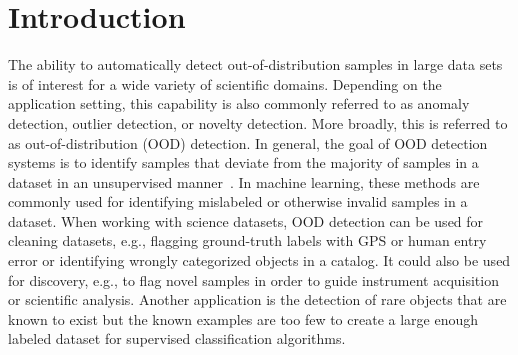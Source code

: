 \documentclass[letterpaper]{article} %
\begin{document}
\section{Introduction}
The ability to automatically detect out-of-distribution samples in large data 
sets is of interest for a wide variety of scientific domains. Depending on the
 application setting, this capability is also commonly referred to as anomaly
  detection, outlier detection, or novelty detection. More broadly, this is 
  referred to as out-of-distribution (OOD) detection. In general, the goal of 
  OOD detection systems is to identify samples that deviate from the majority
   of samples in a dataset in an unsupervised manner~\cite{pimentel2014review}. 
   In machine learning, these methods are commonly used for identifying 
   mislabeled or otherwise invalid samples in a dataset. When working with science datasets, OOD detection can be used for 
   cleaning datasets, e.g., flagging ground-truth labels with GPS or human
    entry error or identifying wrongly categorized objects in a catalog. 
    It could also be used for discovery, e.g., to flag novel samples in order 
    to guide instrument acquisition or scientific analysis. Another application
   is the detection of rare objects that are known to exist but the known
   examples are too few to create a large enough labeled dataset for 
   supervised classification algorithms. 
   
\end{document}
